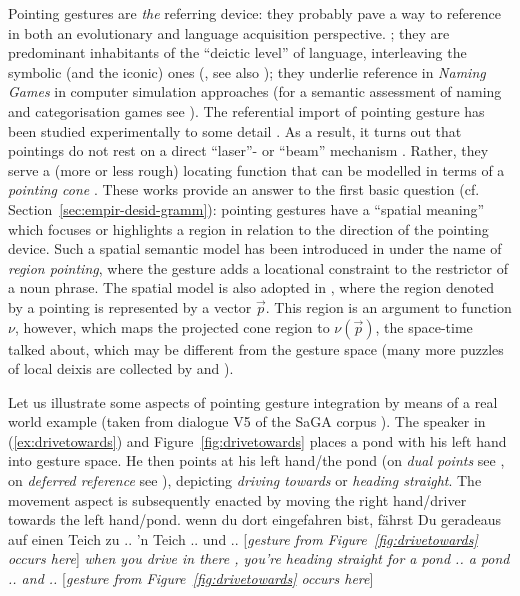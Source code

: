 \documentclass[output=paper]{langsci/langscibook}
\begin{document}
 
Pointing gestures are \emph{the} referring device:
%
they probably pave a way to reference in both an evolutionary and language acquisition perspective. \citep{Bruner:1998,Masataka:2003,Matthews:Behne:Lieven:Tomasello:2012};
%
they are predominant inhabitants of the \enquote{deictic level} of language, interleaving the symbolic (and the iconic) ones (\citet{Levinson:2008}, see also \citet{Buehler:1934:ORIG});
%
they underlie reference in \textit{Naming Games} in computer simulation approaches \citep{Steels:1995} (for a semantic assessment of naming and categorisation games see \citet{Luecking:Mehler:2012}).  
%
The referential import of pointing gesture has been studied experimentally to some detail \citep{Bangerter:Oppenheimer:2006,Kranstedt:Luecking:Pfeiffer:Rieser:Wachsmuth:2006:a,Kranstedt:Luecking:Pfeiffer:Rieser:Wachsmuth:2006:b,van:der:Sluis:Krahmer:2007}. 
%
As a result, it turns out that pointings do not rest on a direct \enquote{laser}- or \enquote{beam} mechanism \citep{McGinn:1981}.
%
Rather, they serve a (more or less rough) locating function \citep{Clark:1996} that can be modelled in terms of a \emph{pointing cone} \citep{Luecking:Pfeiffer:Rieser:2015}. 
%
These works provide an answer to the first basic question (cf. Section~\ref{sec:empir-desid-gramm}): pointing gestures have a \enquote{spatial meaning} which focuses or highlights a region in relation to the direction of the pointing device.
%
Such a spatial semantic model has been introduced in \citet{Rieser:2004} under the name of \emph{region pointing}, where the gesture adds a locational constraint to the restrictor of a noun phrase.
%
The spatial model is also adopted in \citet{Lascarides:Stone:2009:a}, where the region denoted by a pointing is represented by a vector $\vec{p}$.
%
This region is an argument to function $\nu$, however, which maps the projected cone region to $\nu(\vec{p})$, the space-time talked about, which may be different from the gesture space (many more puzzles of local deixis are collected by \citet{Klein:1978} and \citet{Fricke:2007:a}).


Let us illustrate some aspects of pointing gesture integration by means of a real world example (taken from dialogue V5 of the SaGA corpus \citep{Luecking:Bergmann:Hahn:Kopp:Rieser:2010}).
%
The speaker in (\ref{ex:drivetowards}) and Figure~\ref{fig:drivetowards} places a pond with his left hand into gesture space.
%
He then points at his left hand/the pond (on \emph{dual points} see \citet{Goodwin:2003}, on \emph{deferred reference} see \citet{Quine:1950,Nunberg:1993}), depicting \textit{driving towards} or \textit{heading straight}.
%
The movement aspect is subsequently enacted by moving the right hand/driver towards the left hand/pond.
%
\ea \label{ex:drivetowards}
\glt wenn du dort eingefahren bist, fährst Du geradeaus auf einen Teich zu .. 'n Teich .. und .. [\textit{gesture from Figure~\ref{fig:drivetowards} occurs here}] 
\glt \textit{when you drive in there , you're heading straight for a pond .. a pond .. and .. } [\textit{gesture from Figure~\ref{fig:drivetowards} occurs here}] 
\z 
\end{document}
